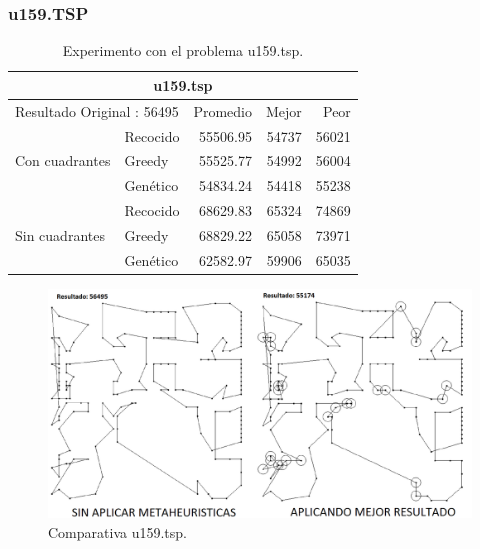 \subsubsection{u159.TSP}
\begin{table}[hbtp]
 \centering 
    \caption{Experimento con el problema u159.tsp.} 
	\begin{tabular}{ | l   l | r | r | r |   }
       \hline\multicolumn{5}{|c|}{ \rowcolor[gray]{0.8}u159.tsp} \\\hline
         \multicolumn{2}{|l|}{Resultado Original : 56495} & Promedio & Mejor & Peor \\ \hline
                & Recocido  & 55506.95 & 54737 & 56021 \\ 
 Con cuadrantes & Greedy    & 55525.77 & 54992 & 56004 \\ 
                & Genético  & \cellcolor[gray]{0.9} 54834.24 & \cellcolor[gray]{0.9} 54418 & \cellcolor[gray]{0.9} 55238 \\ \hline
                & Recocido  & 68629.83 & 65324 & 74869 \\ 
 Sin cuadrantes & Greedy    & 68829.22 & 65058 & 73971 \\ 
                & Genético  & \cellcolor[gray]{0.9} 62582.97 & \cellcolor[gray]{0.9} 59906 & \cellcolor[gray]{0.9} 65035 \\ 
                \hline
    \end{tabular}
    \label{table:EXP_u159.tsp}
\end{table}
\begin{figure}[hbtp]
    \centering
        \includegraphics[width=1\textwidth]{PruebasResultados/Experimentos_Comparativas/u159.png}
        \caption{Comparativa u159.tsp.}
        \label{fig:u159_comparativa.png}
\end{figure}
